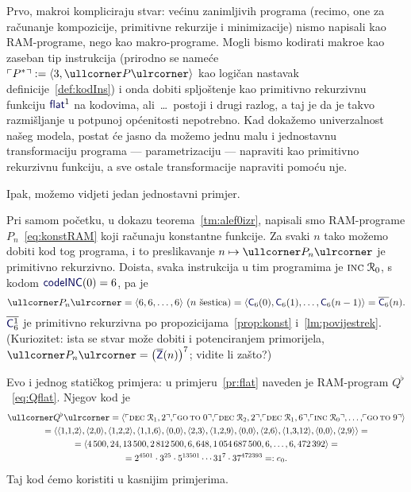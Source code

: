 Prvo, makroi kompliciraju stvar: većinu zanimljivih programa (recimo, one za računanje kompozicije, primitivne rekurzije i minimizacije) nismo napisali kao RAM-programe, nego kao makro-programe. Mogli bismo kodirati makroe kao zaseban tip instrukcija (prirodno se nameće $\kins{P^*}:=\langle3,\kprog{P}\rangle$ kao logičan nastavak definicije~\ref{def:kodIns}) i onda dobiti spljoštenje kao primitivno rekurzivnu funkciju $\f{flat}^1$ na kodovima, ali~\ldots\ postoji i drugi razlog, a taj je da je takvo razmišljanje u potpunoj općenitosti nepotrebno. Kad dokažemo univerzalnost našeg modela, postat će jasno da možemo jednu malu i jednostavnu transformaciju programa --- parametrizaciju --- napraviti kao primitivno rekurzivnu funkciju, a sve ostale transformacije napraviti pomoću nje.

Ipak, možemo vidjeti jedan jednostavni primjer.

\begin{primjer}\label{pr:kodkonst}
Pri samom početku, u dokazu teorema~\ref{tm:alef0izr}, napisali smo RAM-pro\-gra\-me $P_n$~\eqref{eq:konstRAM} koji računaju konstantne funkcije. Za svaki $n$ tako možemo dobiti kod tog programa, i to preslikavanje $n\mapsto\kprog{P_n}$ je primitivno rekurzivno. Doista, svaka instrukcija u tim programima je $\textsc{inc}\;\mathcal R_{0}$, s kodom $\f{codeINC}(0)=6$, pa je
\begin{equation}
    \kprog{P_n}=\langle6,6,\dotsc,6\rangle\text{ ($n$ šestica)}=\langle \f C_6(0),\f C_6(1),\dotsc,\f C_6(n-1)\rangle=\overline{\f C_6}(n)\text.
\end{equation}
$\overline{\f C_6^1}$ je primitivno rekurzivna po propozicijama~\ref{prop:konst} i~\ref{lm:povijestrek}.
(Kuriozitet: ista se stvar može dobiti i potenciranjem primorijela, $\kprog{P_n}=\bigl(\overline{\f Z}(n)\bigr)^7$\!; vidite li zašto?)
\end{primjer}

\begin{primjer}\label{pr:Qflatkod}
Evo i jednog statičkog primjera: u primjeru~\ref{pr:flat} naveden je RAM-program $Q^\flat$~\eqref{eq:Qflat}. Njegov kod je
\begin{multline}
    \kprog{Q^\flat}=\langle\kins{\decr12},\!\kins{\goto\;0},\!\kins{\decr22},\!\kins{\decr16},\!\kins{\incr0},\dotsc,\!\kins{\goto\;9}\rangle\\
    =\langle\langle1,\!1,\!2\rangle,\langle2,\!0\rangle,\langle1,\!2,\!2\rangle,\langle1,\!1,\!6\rangle,\langle0,\!0\rangle,\langle2,\!3\rangle,\langle1,\!2,\!9\rangle,\langle0,\!0\rangle,\langle2,\!6\rangle,\langle1,\!3,\!12\rangle,\langle0,\!0\rangle,\langle2,\!9\rangle\rangle=\\
    =\langle4\,500,24,13\,500,2\,812\,500,6,648,1\,054\,687\,500,6,\dotsc,6,472\,392\rangle=\\
    =2^{4501}\cdot3^{25}\cdot5^{13501}\dotsm31^7\cdot37^{472393}=:e_0\text.
\end{multline}
Taj kod ćemo koristiti u kasnijim primjerima.
\end{primjer}

